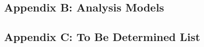 \documentclass[compsoc,draftclsnofoot,onecolumn,10pt]{IEEEtran}
\begin{document}
\subsection{Appendix B: Analysis Models}

\subsection{Appendix C: To Be Determined List}
\end{document}
